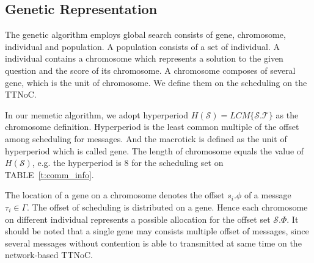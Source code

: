 \documentclass[journal]{IEEEtran}
\newcommand{\calS}{\mathcal{S}}
\newcommand{\calT}{\mathcal{T}}
\theoremstyle{remark}
\begin{document}
\subsection{Genetic Representation}

The genetic algorithm employs global search consists of gene, chromosome,
 individual and population. 
A population consists of a set of individual. 
A individual contains a chromosome which represents a solution to the given question and the score of its chromosome. 
A chromosome composes of several gene,
 which is the unit of chromosome.
We define them on the scheduling on the TTNoC.

In our memetic algorithm,
 we adopt hyperperiod  $H(\calS) = LCM\{\calS.\calT\}$
 as the chromosome definition.
Hyperperiod is the least common multiple of the offset among scheduling for messages. 
And the macrotick is defined as the unit of hyperperiod which is called gene.
The length of chromosome equals the value of $H(\calS)$,
 e.g. the hyperperiod is 8 for the scheduling set on TABLE~\ref{t:comm_info}. 

The location of a gene on a chromosome denotes the offset $ s_i.\phi $ of a message $\tau_i\in\Gamma$.
The offset of scheduling is distributed on a gene.
Hence each chromosome on different individual represents a possible allocation for the offset set $\calS.\Phi$.
It should be noted that a single gene may consists multiple offset of messages,
 since several messages without contention is able to transmitted at same time on the network-based TTNoC.
\end{document}
